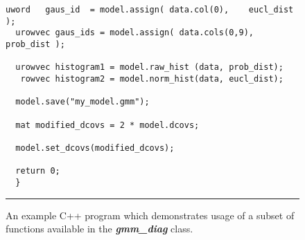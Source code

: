 \begin{figure}[!h]
\begin{adjustbox}{minipage=\columnwidth,scale={1}{1.2}}
\begin{Verbatim}[fontsize=\footnotesize]
  uword   gaus_id  = model.assign( data.col(0),    eucl_dist );
  urowvec gaus_ids = model.assign( data.cols(0,9), prob_dist );
  
  urowvec histogram1 = model.raw_hist (data, prob_dist);
   rowvec histogram2 = model.norm_hist(data, eucl_dist);
  
  model.save("my_model.gmm");
  
  mat modified_dcovs = 2 * model.dcovs;
  
  model.set_dcovs(modified_dcovs);
  
  return 0;
  }

\end{Verbatim}
\end{adjustbox}
\hrule
\vspace{0.5ex}
\caption
  {
  An example C++ program which demonstrates usage of a subset of functions available in the {\it\bfseries gmm\_diag} class.
  }
\label{fig:example_usage}


\vspace{17ex}
\end{figure}


% 
% 
%   
%   
%   
%   
%   
%   
%   
%   
%   
%   
%   
%   
%   
%   
%   
%   
